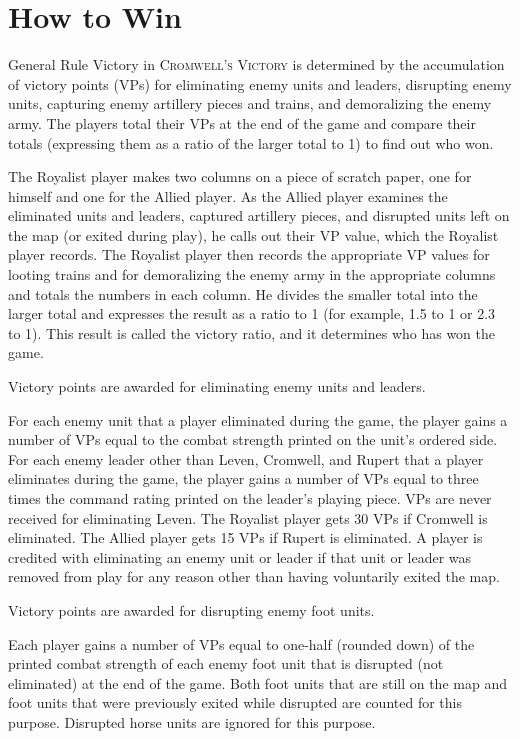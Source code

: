 \section{How to Win}

\begin{rulebox}{General Rule}
Victory in \textsc{Cromwell's Victory} is determined by the accumulation of victory points (VPs) for eliminating enemy units and leaders, disrupting enemy units, capturing enemy artillery pieces and trains, and demoralizing the enemy army. The players total their VPs at the end of the game and compare their totals (expressing them as a ratio of the larger total to 1) to find out who won.
\end{rulebox}


The Royalist player makes two columns on a piece of scratch paper, one for himself and one for the Allied player. As the Allied player examines the eliminated units and leaders, captured artillery pieces, and disrupted units left on the map (or exited during play), he calls out their VP value, which the Royalist player records. The Royalist player then records the appropriate VP values for looting trains and for demoralizing the enemy army in the appropriate columns and totals the numbers in each column. He divides the smaller total into the larger total and expresses the result as a ratio to 1 (for example, 1.5 to 1 or 2.3 to 1). This result is called the victory ratio, and it determines who has won the game.

 Victory points are awarded for eliminating enemy units and leaders.

For each enemy unit that a player eliminated during the game, the player gains a number of VPs equal to the combat strength printed on the unit's ordered side. For each enemy leader other than Leven, Cromwell, and Rupert that a player eliminates during the game, the player gains a number of VPs equal to three times the command rating printed on the leader's playing piece. VPs are never received for eliminating Leven. The Royalist player gets 30 VPs if Cromwell is eliminated. The Allied player gets 15 VPs if Rupert is eliminated. A player is credited with eliminating an enemy unit or leader if that unit or leader was removed from play for any reason other than having voluntarily exited the map.

 Victory points are awarded for disrupting enemy foot units.

Each player gains a number of VPs equal to one-half (rounded down) of the printed combat strength of each enemy foot unit that is disrupted (not eliminated) at the end of the game. Both foot units that are still on the map and foot units that were previously exited while disrupted are counted for this purpose. Disrupted horse units are ignored for this purpose.

